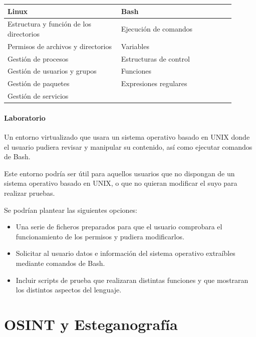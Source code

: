        \begin{tabular}{|m{0.45\linewidth}|m{0.45\linewidth}|}                
            \hline
            \textbf{Linux} & \textbf{Bash} \\
            \hline
            Estructura y función de los directorios & Ejecución de comandos \\
            Permisos de archivos y directorios & Variables \\
            Gestión de procesos & Estructuras de control \\
            Gestión de usuarios y grupos & Funciones \\
            Gestión de paquetes & Expresiones regulares \\
            Gestión de servicios & \\
            \hline
        \end{tabular}

        \paragraph{Laboratorio}

            Un entorno virtualizado que usara un sistema operativo basado en UNIX donde el usuario pudiera revisar y manipular su contenido, así como ejecutar comandos de Bash.

            Este entorno podría ser útil para aquellos usuarios que no dispongan de un sistema operativo basado en UNIX, o que no quieran modificar el suyo para realizar pruebas.

            Se podrían plantear las siguientes opciones:
            
            \begin{itemize}
                \item Una serie de ficheros preparados para que el usuario comprobara el funcionamiento de los permisos y pudiera modificarlos.
                \item Solicitar al usuario datos e información del sistema operativo extraíbles mediante comandos de Bash.
                \item Incluir scripts de prueba que realizaran distintas funciones y que mostraran los distintos aspectos del lenguaje.
            \end{itemize}


    \section{OSINT y Esteganografía}

